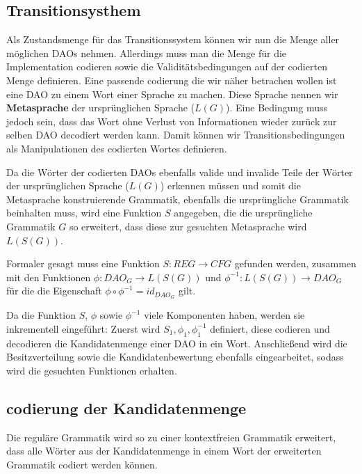 \documentclass[a4paper,12pt]{report}
\begin{document}
% 




\subsection*{Transitionsysthem}
Als Zustandsmenge für das Transitionssystem können wir nun die Menge aller möglichen DAOs nehmen. Allerdings muss man die Menge für die Implementation codieren sowie die Validitätsbedingungen auf der codierten Menge definieren. Eine passende codierung die wir näher betrachen wollen ist eine DAO zu einem Wort einer Sprache zu machen. Diese Sprache nennen wir \textbf{Metasprache} der ursprünglichen Sprache ($L(G)$). Eine Bedingung muss jedoch sein, dass das Wort ohne Verlust von Informationen wieder zurück zur selben DAO decodiert werden kann. Damit können wir Transitionsbedingungen als Manipulationen des codierten Wortes definieren. 

Da die Wörter der codierten DAOs ebenfalls valide und invalide Teile der Wörter der ursprünglichen Sprache ($L(G)$) erkennen müssen und somit die Metasprache konstruierende Grammatik, ebenfalls die ursprüngliche Grammatik beinhalten muss, wird eine Funktion $S$ angegeben, die die ursprüngliche Grammatik $G$ so erweitert, dass diese zur gesuchten Metasprache wird $L(S(G))$.

Formaler gesagt muss eine Funktion $S: REG\rightarrow CFG$ gefunden werden, zusammen mit den Funktionen $\phi: DAO_G \rightarrow L(S(G))$ und $\phi^{-1}: L(S(G)) \rightarrow DAO_G$ für die die Eigenschaft $\phi\circ\phi^{-1} = id_{DAO_G}$ gilt.

Da die Funktion $S$, $\phi$ sowie $\phi^{-1}$ viele Komponenten haben, werden sie inkrementell eingeführt: Zuerst wird $S_1, \phi_1, \phi^{-1}_1$ definiert, diese codieren und decodieren die Kandidatenmenge einer DAO in ein Wort. Anschließend wird die Besitzverteilung sowie die Kandidatenbewertung ebenfalls eingearbeitet, sodass wird die gesuchten Funktionen erhalten.

\subsection{codierung der Kandidatenmenge}
\label{codekand}
Die reguläre Grammatik wird so zu einer kontextfreien Grammatik erweitert, dass alle Wörter aus der Kandidatenmenge in einem Wort der erweiterten Grammatik codiert werden können. 
\end{document}
